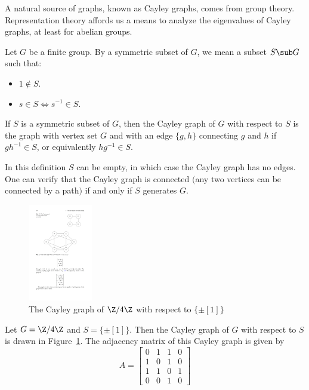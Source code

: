 A natural source of graphs, known as Cayley graphs, comes from group theory.
Representation theory affords us a means to analyze the eigenvalues of Cayley
graphs, at least for abelian groups.
\begin{definition}
Let $G$ be a finite group. By a symmetric subset of $G$, we mean a subset $S\sub G$ such that:
\begin{itemize}
\item $1\notin S$.
\item $s\in S\iff s^{-1}\in S$.
\end{itemize}
If $S$ is a symmetric subset of $G$, then the Cayley graph of $G$ with respect to $S$ is the graph with vertex set $G$ and with an edge $\{g,h\}$ connecting $g$ and $h$ if $gh^{-1}\in S$, or equivalently $hg^{-1}\in S$.
\end{definition}
\begin{remark}
In this definition $S$ can be empty, in which case the Cayley graph has no edges. One can verify that the Cayley graph is connected $($any two vertices
can be connected by a path$)$ if and only if $S$ generates $G$.
\end{remark}
\begin{figure}[htbp]
\centering
\includegraphics[width=0.25\textwidth]{pictures/Cayley-1.pdf}
\caption{The Cayley graph of $\Z/4\Z$ with respect to $\{\pm[1]\}$}
\label{Cayley graph eg-1}
\end{figure}
\begin{example}
Let $G=\Z/4\Z$ and $S=\{\pm[1]\}$. Then the Cayley graph of $G$ with respect to $S$ is drawn in Figure~\ref{Cayley graph eg-1}. The adjacency matrix of this Cayley graph is given by
\[A=\begin{bmatrix}
0&1&1&0\\
1&0&1&0\\
1&1&0&1\\
0&0&1&0
\end{bmatrix}\]
\end{example}
